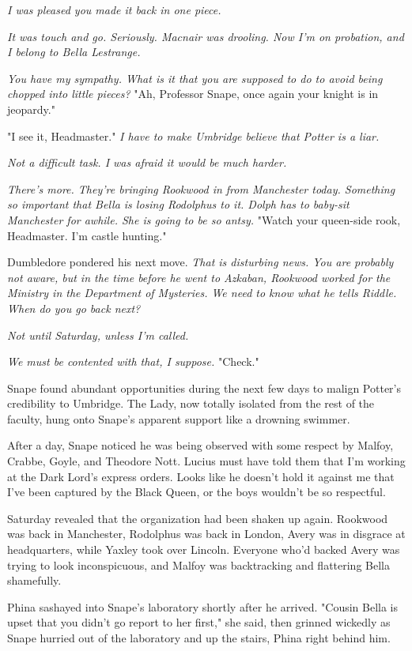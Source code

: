 \emph{I was pleased you made it back in one piece.}

\emph{It was touch and go. Seriously. Macnair was drooling. Now I'm on probation, and I belong to Bella Lestrange.}

\emph{You have my sympathy. What is it that you are supposed to do to avoid being chopped into little pieces?} "Ah, Professor Snape, once again your knight is in jeopardy."

"I see it, Headmaster." \emph{I have to make Umbridge believe that Potter is a liar.}

\emph{Not a difficult task. I was afraid it would be much harder.}

\emph{There's more. They're bringing Rookwood in from Manchester today. Something so important that Bella is losing Rodolphus to it. Dolph has to baby-sit Manchester for awhile. She is going to be so antsy.} "Watch your queen-side rook, Headmaster. I'm castle hunting."

Dumbledore pondered his next move. \emph{That is disturbing news. You are probably not aware, but in the time before he went to Azkaban, Rookwood worked for the Ministry{\el} in the Department of Mysteries. We need to know what he tells Riddle. When do you go back next?}

\emph{Not until Saturday, unless I'm called.}

\emph{We must be contented with that, I suppose.} "Check."

Snape found abundant opportunities during the next few days to malign Potter's credibility to Umbridge. The Lady, now totally isolated from the rest of the faculty, hung onto Snape's apparent support like a drowning swimmer.

After a day, Snape noticed he was being observed with some respect by Malfoy, Crabbe, Goyle, and Theodore Nott. Lucius must have told them that I'm working at the Dark Lord's express orders. Looks like he doesn't hold it against me that I've been captured by the Black Queen, or the boys wouldn't be so respectful.

Saturday revealed that the organization had been shaken up again. Rookwood was back in Manchester, Rodolphus was back in London, Avery was in disgrace at headquarters, while Yaxley took over Lincoln. Everyone who'd backed Avery was trying to look inconspicuous, and Malfoy was backtracking and flattering Bella shamefully.

Phina sashayed into Snape's laboratory shortly after he arrived. "Cousin Bella is upset that you didn't go report to her first," she said, then grinned wickedly as Snape hurried out of the laboratory and up the stairs, Phina right behind him.

